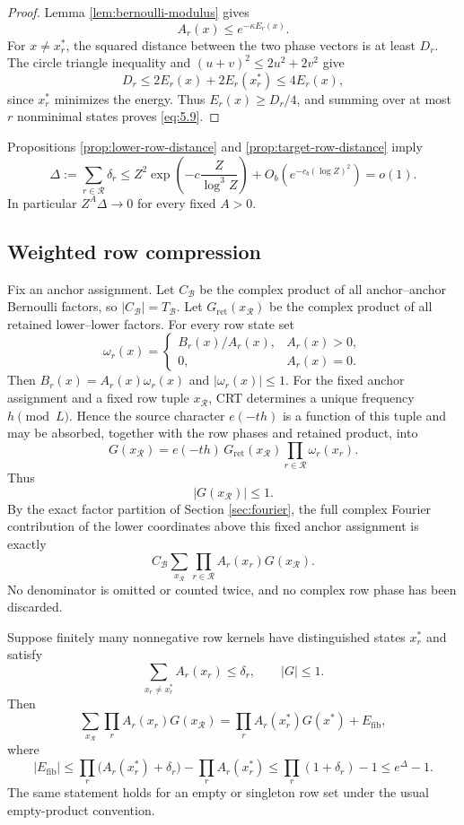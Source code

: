 \begin{proof}
Lemma \ref{lem:bernoulli-modulus} gives
\[
A_r(x)\le e^{-\kappa E_r(x)}.
\]
For $x\ne x_r^*$, the squared distance between the two phase vectors is at least $D_r$. The circle triangle inequality and $(u+v)^2\le2u^2+2v^2$ give
\[
D_r
\le2E_r(x)+2E_r(x_r^*)
\le4E_r(x),
\]
since $x_r^*$ minimizes the energy. Thus $E_r(x)\ge D_r/4$, and summing over at most $r$ nonminimal states proves \eqref{eq:5.9}.
\end{proof}

Propositions \ref{prop:lower-row-distance} and \ref{prop:target-row-distance} imply
\[
\Delta:=\sum_{r\in\mathcal R}\delta_r
\le
Z^2\exp\!\left(-c\frac{Z}{\log^3Z}\right)
+O_b\!\left(e^{-c_b(\log Z)^2}\right)
=o(1).
\tag{5.10}\label{eq:5.10}
\]
In particular $Z^A\Delta\to0$ for every fixed $A>0$.

\subsection{Weighted row compression}

Fix an anchor assignment. Let $C_{\mathcal B}$ be the complex product of all anchor--anchor Bernoulli factors, so $|C_{\mathcal B}|=T_{\mathcal B}$. Let $G_{\mathrm{ret}}(x_{\mathcal R})$ be the complex product of all retained lower--lower factors. For every row state set
\[
\omega_r(x)=
\begin{cases}
B_r(x)/A_r(x),&A_r(x)>0,\\
0,&A_r(x)=0.
\end{cases}
\]
Then $B_r(x)=A_r(x)\omega_r(x)$ and $|\omega_r(x)|\le1$. For the fixed anchor assignment and a fixed row tuple $x_{\mathcal R}$, CRT determines a unique frequency $h\pmod L$. Hence the source character $e(-th)$ is a function of this tuple and may be absorbed, together with the row phases and retained product, into
\[
G(x_{\mathcal R})
=
e(-th)\,G_{\mathrm{ret}}(x_{\mathcal R})
\prod_{r\in\mathcal R}\omega_r(x_r).
\]
Thus
\[
|G(x_{\mathcal R})|\le1.
\tag{5.11}\label{eq:5.11}
\]
By the exact factor partition of Section \ref{sec:fourier}, the full complex Fourier contribution of the lower coordinates above this fixed anchor assignment is exactly
\[
C_{\mathcal B}
\sum_{x_{\mathcal R}}
\prod_{r\in\mathcal R}A_r(x_r)G(x_{\mathcal R}).
\]
No denominator is omitted or counted twice, and no complex row phase has been discarded.

\begin{lemma}\label{lem:weighted-skeleton}
Suppose finitely many nonnegative row kernels have distinguished states $x_r^*$ and satisfy
\[
\sum_{x_r\ne x_r^*}A_r(x_r)\le\delta_r,
\qquad |G|\le1.
\]
Then
\[
\sum_{x_{\mathcal R}}
\prod_rA_r(x_r)G(x_{\mathcal R})
=
\prod_rA_r(x_r^*)G(x^*)+E_{\mathrm{fib}},
\tag{5.12}\label{eq:5.12}
\]
where
\[
|E_{\mathrm{fib}}|
\le
\prod_r\bigl(A_r(x_r^*)+\delta_r\bigr)
-
\prod_rA_r(x_r^*)
\le
\prod_r(1+\delta_r)-1
\le e^\Delta-1.
\tag{5.13}\label{eq:5.13}
\]
The same statement holds for an empty or singleton row set under the usual empty-product convention.
\end{lemma}

